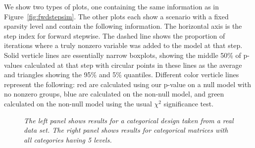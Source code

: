 \documentclass{imsart}
\begin{document}
We show two types of plots, one containing the same information as in
Figure~\ref{fig:fwdstepsim}. The other plots each show a scenario with
a fixed sparsity level and contain the following information. The
horizontal axis is the step index for forward stepwise. The dashed
line shows the proportion of iterations where a truly nonzero variable
was added to the model at that step. Solid verticle lines are essentially
narrow boxplots, showing the middle 50\% of p-values calculated at that
step with circular points in these lines as the average and triangles
showing the 95\% and 5\% quantiles. Different color verticle lines
represent the following: red are calculated using our p-value on a null
model with no nonzero groups, blue are calculated on the non-null
model, and green calculated on the non-null model using the usual
$\chi^2$ significance test.

\begin{figure}[h]
\begin{center}
\hspace{-15pt}
\caption{\small \it The left panel shows results for a categorical design
taken from a real data set.
The right panel shows results for categorical matrices with all categories having 5 levels.}
\end{center}
\end{figure}
\end{document}

